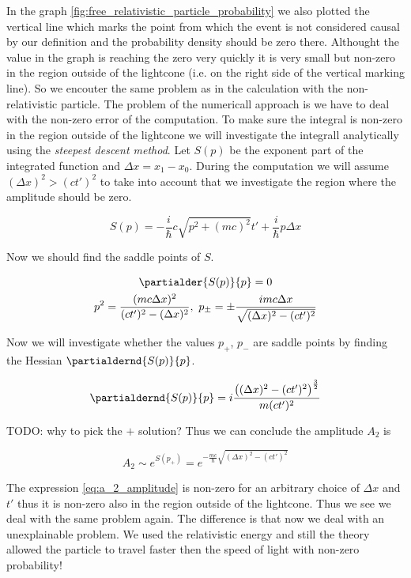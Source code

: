 \clearpage

In the graph \ref{fig:free_relativistic_particle_probability} we also plotted the vertical line which marks the point from which 
the event is not considered causal by our definition and the probability density should be zero there. Althought the value
in the graph is reaching the zero very quickly it is very small but non-zero in the region outside of the lightcone (i.e. on the 
right side of the vertical marking line). So we encouter the same problem as in the calculation with the non-relativistic
particle. The problem of the numericall approach is we have to deal with the non-zero error of the computation. To make
sure the integral is non-zero in the region outside of the lightcone we will investigate the integrall analytically using the 
\textit{steepest descent method}. Let $S(p)$ be the exponent part of the integrated function and $\Delta x = x_{1} - x_{0}$. During
the computation we will assume $(\Delta x)^{2} > (ct')^{2}$ to take into account that we investigate the region where the amplitude
should be zero.

\begin{equation*}
    S(p) = - \frac{i}{\hbar} c \sqrt{p^{2} + (mc)^{2}} t' + \frac{i}{\hbar}p \Delta x
\end{equation*}

Now we should find the saddle points of $S$.

\begin{equation*}
    \begin{gathered}
        \partialder{S(p)}{p} = 0 \\
        p^{2} = \frac{(m c \Delta x)^{2}}{(c t')^{2} - (\Delta x)^{2}}, \ p_{\pm} = \pm \frac{i m c \Delta x}{\sqrt{(\Delta x)^{2} - (c t')^{2}}}
    \end{gathered}
\end{equation*}

Now we will investigate whether the values $p_{+}$, $p_{-}$ are saddle points by finding the Hessian $\partialdernd{S(p)}{p}$.

\begin{equation*}
    \begin{gathered}
        \partialdernd{S(p)}{p} = i \frac{\big((\Delta x)^{2} - (c t')^{2}\big)^{\frac{3}{2}}}{m (ct')^{2}}
    \end{gathered}
\end{equation*}

TODO: why to pick the $+$ solution? Thus we can conclude the amplitude $A_{2}$ is 

\begin{equation}
    \label{eq:a_2_amplitude}
    A_{2} \sim e^{S(p_{+})} = e^{- \frac{mc}{\hbar} \sqrt{(\Delta x)^{2} - (ct')^{2}}}
\end{equation}

The expression \ref{eq:a_2_amplitude} is non-zero for an arbitrary choice of $\Delta x$ and $t'$ thus it is
non-zero also in the region outside of the lightcone. Thus we see we deal with the same problem again.
The difference is that now we deal with an unexplainable problem. We used the relativistic energy and still the theory
allowed the particle to travel faster then the speed of light with non-zero probability! 
